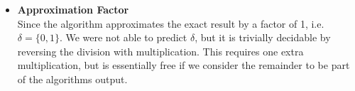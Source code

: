 \begin{itemize}[leftmargin=*]
\item \textbf{Approximation Factor}\\
  Since the algorithm approximates the exact result by a factor of 1, i.e.
  $\delta = \{0,1\}$. We were not able to predict $\delta$, but it is trivially decidable
  by reversing the division with multiplication. This requires one extra
  multiplication, but is essentially free if we consider the remainder to be
  part of the algorithms output.
\end{itemize}






